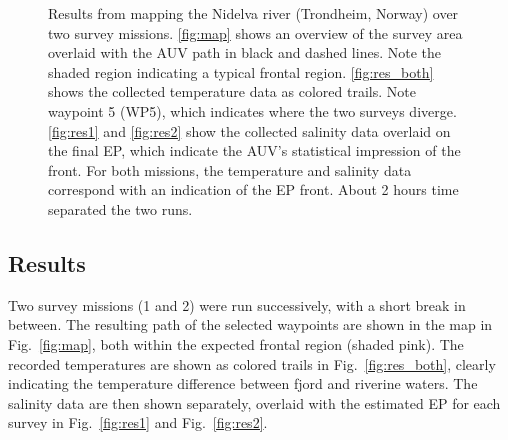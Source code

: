 \documentclass[aoas]{imsart}
\begin{document}
\begin{figure}[!h]
\hspace{0.2cm}
\caption{Results from mapping the Nidelva river (Trondheim, Norway)
  over two survey missions. \ref{fig:map} shows an overview of the
  survey area overlaid with the AUV path in black and dashed
  lines. Note the shaded region indicating a typical frontal
  region. \ref{fig:res_both} shows the collected temperature data as
  colored trails. Note waypoint 5 (WP5), which indicates where the two
  surveys diverge. \ref{fig:res1} and \ref{fig:res2} show the
  collected salinity data overlaid on the final EP, which indicate the
  AUV's statistical impression of the front. For both missions, the
  temperature and salinity data correspond with an indication of the
  EP front. About 2 hours time separated the two runs.}
\label{fig:results}
\end{figure}

\subsection{Results}

Two survey missions (1 and 2) were run successively, with a short
break in between. The resulting path of the selected waypoints are
shown in the map in Fig.~\ref{fig:map}, both within the expected
frontal region (shaded pink). The recorded temperatures are shown as
colored trails in Fig.~\ref{fig:res_both}, clearly indicating the
temperature difference between fjord and riverine waters. The salinity
data are then shown separately, overlaid with the estimated EP for
each survey in Fig.~\ref{fig:res1} and Fig.~\ref{fig:res2}.
\end{document}
